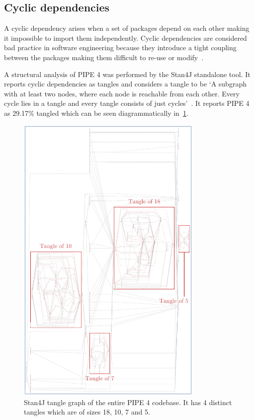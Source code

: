 \subsection{Cyclic dependencies}
A cyclic dependency arises when a set of packages depend on each other making it impossible to import them independently. Cyclic dependencies are considered bad practice in software engineering because they introduce a tight coupling between the packages making them difficult to re-use or modify~\cite{whats_wrong_with_circular_references}.


A structural analysis of PIPE 4 was performed by the Stan4J standalone tool. It reports cyclic dependencies as tangles and considers a tangle to be `A subgraph with at least two nodes, where each node is reachable from each other. Every cycle lies in a tangle and every tangle consists of just cycles'~\cite{stan_whitepaper}. It reports PIPE 4 as 29.17\% tangled which can be seen diagrammatically in~\cref{fig:tangle}.

\begin{figure}[tb]
\begin{center}
    \includegraphics[width=0.8\textwidth]{analysis/tangle_annotated.png} 
    \caption{Stan4J tangle graph of the entire PIPE 4 codebase. It has 4 distinct tangles which are of sizes 18, 10, 7 and 5.}
    \label{fig:tangle}
\end{center}
\end{figure}

% 

